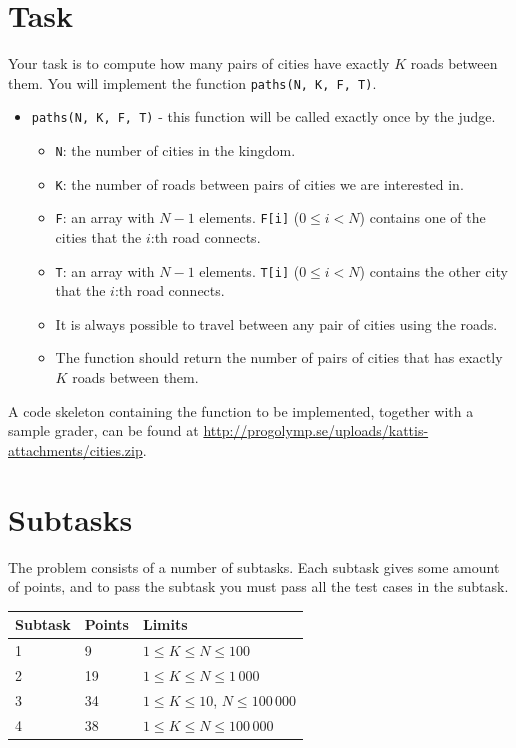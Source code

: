 \section*{Task}
Your task is to compute how many pairs of cities have exactly $K$ roads between them. You will implement the function \texttt{paths(N, K, F, T)}.
\begin{itemize}
  \item \texttt{paths(N, K, F, T)} - this function will be called exactly once by the judge.
  \begin{itemize}
    \item \texttt{N}: the number of cities in the kingdom.
    \item \texttt{K}: the number of roads between pairs of cities we are interested in.
    \item \texttt{F}: an array with $N - 1$ elements. \texttt{F[i]} ($0 \le i < N$) contains one of the cities that the $i$:th road connects.
    \item \texttt{T}: an array with $N - 1$ elements. \texttt{T[i]} ($0 \le i < N$) contains the other city that the $i$:th road connects.
    \item It is always possible to travel between any pair of cities using the roads.
    \item The function should return the number of pairs of cities that has exactly $K$ roads between them.
  \end{itemize}
\end{itemize}

A code skeleton containing the function to be implemented, together with a sample grader, can be found at
\url{http://progolymp.se/uploads/kattis-attachments/cities.zip}.

\section*{Subtasks}
The problem consists of a number of subtasks. Each subtask gives some amount of points, and to pass
the subtask you must pass all the test cases in the subtask.

\begin{tabular}{|l|l|l|}
  \hline
  \textbf{Subtask} & \textbf{Points} & \textbf{Limits} \\ \hline
  1 & 9 & $1 \le K \le N \le 100$ \\ \hline
  2 & 19 & $1 \le K \le N \le 1\,000$ \\ \hline
  3 & 34 & $1 \le K \le 10$, $N \le 100\,000$ \\ \hline
  4 & 38 & $1 \le K \le N \le 100\,000$ \\ \hline
\end{tabular}

